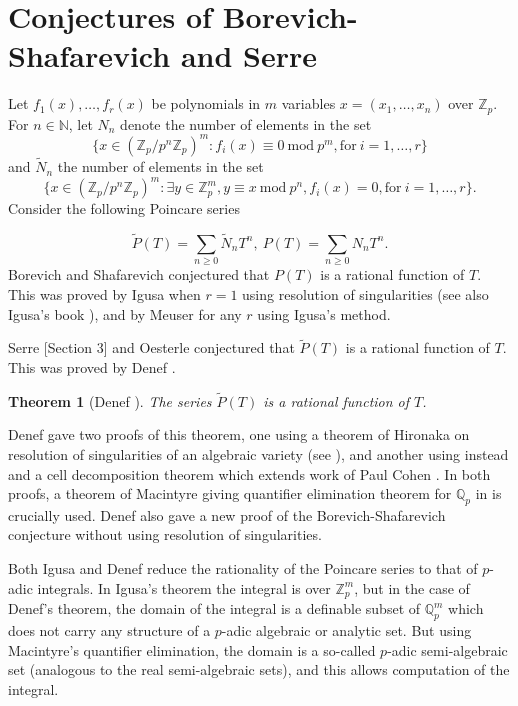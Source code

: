 \documentclass[12pt]{amsart}
\def\N{\mathbb{N}}
\def\Z{\mathbb{Z}}
\def\Q{\mathbb{Q}}
\newtheorem{thm}{Theorem}[section]
\numberwithin{equation}{section}
\begin{document}
\section{\bf Conjectures of Borevich-Shafarevich and Serre}
Let $f_1(x),\dots,f_r(x)$ be polynomials in $m$ variables $x=(x_1,\dots,x_n)$ over $\Z_p$.  For $n\in \N$, let $N_n$ denote the 
number of elements in the set
$$\{x \in (\Z_p/p^n \Z_p)^m: f_i(x)\equiv 0 \ \mathrm{mod} \ p^m, \mathrm{for} \ i=1,\dots,r\}$$
and $\tilde{N}_n$ the number of elements in the set
$$\{x\in (\Z_p/p^n \Z_p)^m: \exists y \in \Z_p^m, y\equiv x \ \mathrm{mod} \ p^n, f_i(x)=0, \mathrm{for} \ i=1,\dots,r\}.$$
Consider the following Poincare series

$$\tilde{P}(T)=\sum_{n\geq 0} \tilde{N}_n T^n, \ P(T)=\sum_{n\geq 0} N_n T^n.$$
Borevich and Shafarevich \cite[page 6]{bor-shaf-book} conjectured that $P(T)$ is a rational function of $T$. This was proved by 
Igusa \cite{igusa-cx-pow1} when $r=1$ using resolution of singularities (see also Igusa's book \cite{igusa-book}), and by Meuser \cite{Meuser} for any $r$ using Igusa's method. 

Serre [Section 3]\cite{serre-conj} and Oesterle \cite{oesterle} 
conjectured that $\tilde{P}(T)$ is a rational function of $T$. This was proved 
by Denef \cite{Denefrationality}. 
\begin{thm}[Denef \cite{Denefrationality}] \label{denef-thm1} The series $\tilde{P}(T)$ is a rational function of $T$.
\end{thm}
Denef gave two proofs of this theorem, one using a theorem of Hironaka on resolution of singularities of an algebraic variety (see \cite{igusa-book}), and another using instead and a cell decomposition theorem \cite{Denefrationality} which extends work of Paul Cohen \cite{Cohen}. In both proofs, a theorem of Macintyre \cite{Macintyre1} giving quantifier elimination theorem for $\Q_p$ in is crucially used. Denef also gave a new proof of the Borevich-Shafarevich conjecture without using resolution of singularities.

Both Igusa and Denef reduce the rationality of the Poincare series to that of $p$-adic integrals. In Igusa's theorem the integral is over $\Z_p^m$, but in the case of Denef's theorem, the domain of the integral is a definable subset of $\Q_p^m$ which does not carry any structure of a $p$-adic algebraic or analytic set. But using Macintyre's quantifier elimination, the domain is a so-called $p$-adic semi-algebraic set (analogous to the real semi-algebraic sets), and this allows computation of the integral.
\end{document}
